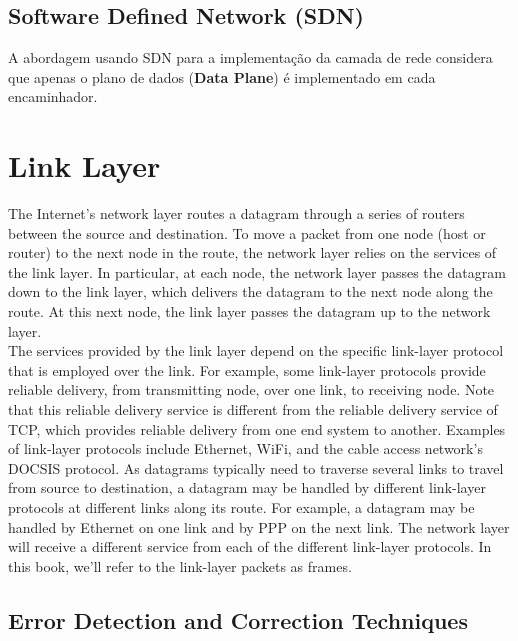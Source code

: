 \documentclass[12pt]{article}
\begin{document}
\subsection{Software Defined Network (SDN)}

A abordagem usando SDN para a implementação da camada de rede considera que apenas o plano de dados (\textbf{Data Plane}) é implementado em cada encaminhador.

\newpage

\section{Link Layer}

The Internet's network layer routes a datagram through a series of routers between the source and destination. To move a packet from one node (host or router) to the next node in the route, the network layer relies on the services of the link layer. In particular, at each node, the network layer passes the datagram down to the link layer, which delivers the datagram to the next node along the route. At this next node, the link layer passes the datagram up to the network layer. 
\vspace{0.5cm} \\
The services provided by the link layer depend on the specific link-layer protocol that is employed over the link. For example, some link-layer protocols provide reliable delivery, from transmitting node, over one link, to receiving node. Note that this reliable delivery service is different from the reliable delivery service of TCP, which provides reliable delivery from one end system to another. Examples of link-layer protocols include Ethernet, WiFi, and the cable access network's DOCSIS protocol. As datagrams typically need to traverse several links to travel from source to destination, a datagram may be handled by different link-layer protocols at different links along its route. For example, a datagram may be handled by Ethernet on one link and by PPP on the next link. The network layer will receive a different service from each of the different link-layer protocols. In this book, we'll refer to the link-layer packets as
frames.

\subsection{}

\subsection{Error Detection and Correction Techniques}
\end{document}
